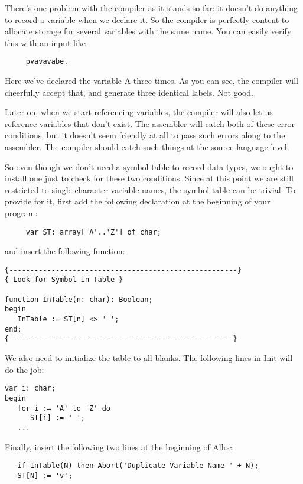 There's one problem  with  the  compiler  as it stands so far: it doesn't do anything to record a variable when we declare it. So the compiler is perfectly content to allocate storage for several variables with the same name. You can easily verify this with an input like

\begin{verbatim}
     pvavavabe.
\end{verbatim}

Here we've declared the variable A three times. As you  can see, the compiler will  cheerfully  accept  that, and  generate three identical labels. Not good.

Later on, when we start referencing variables, the compiler will also let us reference variables  that don't exist. The assembler will  catch  both  of these error conditions, but it doesn't seem friendly at all to pass such errors along to the assembler. The compiler should catch such things at the source language level.

So even though we don't need a symbol table to record data types, we ought to install  one  just to check for these two conditions. Since at this  point  we are still restricted to single-character variable names, the symbol table can be trivial. To  provide for it, first add the following  declaration at the beginning of your program:

\begin{verbatim}
     var ST: array['A'..'Z'] of char;
\end{verbatim}

and insert the following function:

\begin{verbatim}
{------------------------------------------------------}
{ Look for Symbol in Table }

function InTable(n: char): Boolean;
begin
   InTable := ST[n] <> ' ';
end;
{-----------------------------------------------------}
\end{verbatim}

We  also  need  to initialize the  table  to  all  blanks. The following lines in Init will do the job:

\begin{verbatim}
var i: char;
begin
   for i := 'A' to 'Z' do
      ST[i] := ' ';
   ...
\end{verbatim}

Finally, insert  the  following two lines at  the  beginning  of Alloc:

\begin{verbatim}
   if InTable(N) then Abort('Duplicate Variable Name ' + N);
   ST[N] := 'v';
\end{verbatim}

